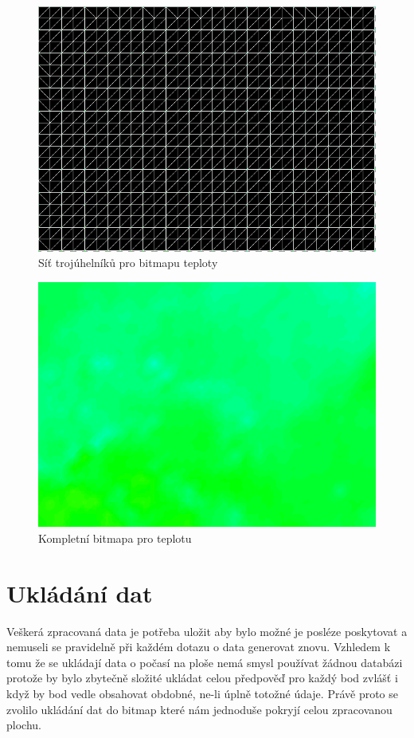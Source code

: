 \documentclass[czech,bachelor,dept460,male,csharp,cpdeclaration]{diploma}
\begin{document}
	\begin{figure}
		\centering
		\includegraphics[scale=0.5]{Data/bmp_sit.png}
		\caption{Síť trojúhelníků pro bitmapu teploty}
		\label{bmpTriang}
	\end{figure}
	
	\begin{figure}
		\centering
		\includegraphics[scale=0.5]{Data/bmp_vybarvena.png}
		\caption{Kompletní bitmapa pro teplotu}
		\label{bmpColors}
	\end{figure}
	
	\section{Ukládání dat}
	
	Veškerá zpracovaná data je potřeba uložit aby bylo možné je posléze poskytovat a nemuseli se pravidelně při každém dotazu o data generovat znovu. Vzhledem k tomu že se ukládají data o počasí na ploše nemá smysl používat žádnou databázi protože by bylo zbytečně složité ukládat celou předpověď pro každý bod zvlášť i když by bod vedle obsahovat obdobné, ne-li úplně totožné údaje. Právě proto se zvolilo ukládání dat do bitmap které nám jednoduše pokryjí celou zpracovanou plochu.
	
\end{document}
